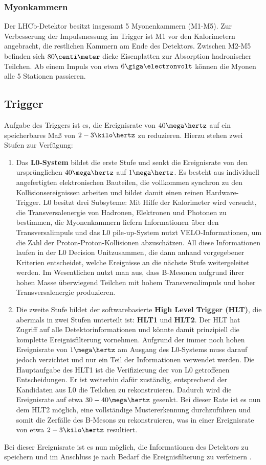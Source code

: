 \subsubsection{Myonkammern}
Der LHCb-Detektor besitzt insgesamt 5 Myonenkammern (M1-M5). Zur Verbesserung der Impulsmessung im Trigger ist M1 vor den Kalorimetern angebracht, die restlichen Kammern am Ende des Detektors. Zwischen M2-M5 befinden sich $80\centi\meter$ dicke Eisenplatten zur Absorption hadronischer Teilchen. Ab einem Impuls von etwa $6\giga\electronvolt$ können die Myonen alle 5 Stationen passieren. \cite{thesis_linn}

\subsection{Trigger}
Aufgabe des Triggers ist es, die Ereignisrate von $40\mega\hertz$ auf ein speicherbares Maß von $2-3\kilo\hertz$ zu reduzieren. Hierzu stehen zwei Stufen zur Verfügung:
\begin{enumerate}
    \item Das \textbf{L0-System} bildet die erste Stufe und senkt die Ereignisrate von den ursprünglichen $40\mega\hertz$ auf $1\mega\hertz$. Es besteht aus individuell angefertigten elektronischen Bauteilen, die vollkommen synchron zu den Kollisionsereignissen arbeiten und bildet damit einen reinen Hardware-Trigger. L0 besitzt drei Subsyteme: Mit Hilfe der Kalorimeter wird versucht, die Transversalenergie von Hadronen, Elektronen und Photonen zu bestimmen, die Myonenkammern liefern Informationen über den Transversalimpuls und das \glqq L0 pile-up\grqq-System nutzt VELO-Informationen, um die Zahl der Proton-Proton-Kollisionen abzuschätzen. All diese Informationen laufen in der \glqq L0 Decision Unit\grqq zusammen, die dann anhand vorgegebener Kriterien entscheidet, welche Ereignisse an die nächste Stufe weitergeleitet werden. Im Wesentlichen nutzt man aus, dass B-Mesonen aufgrund ihrer hohen Masse überwiegend Teilchen mit hohem Transversalimpuls und hoher Transversalenergie produzieren.
    \item Die zweite Stufe bildet der softwarebasierte \textbf{High Level Trigger (HLT)}, die abermals in zwei Stufen unterteilt ist: \textbf{HLT1} und \textbf{HLT2}. Der HLT hat Zugriff auf alle Detektorinformationen und könnte damit prinzipiell die komplette Ereignisfilterung vornehmen. Aufgrund der immer noch hohen Ereignisrate von $1\mega\hertz$ am Ausgang des L0-Systems muss darauf jedoch verzichtet und nur ein Teil der Informationen verwendet werden. Die Hauptaufgabe des HLT1 ist die Verifizierung der von L0 getroffenen Entscheidungen. Er ist weiterhin dafür zuständig, entsprechend der Kandidaten aus L0 die Teilchen zu rekonstruieren. Dadurch wird die Ereignisrate auf etwa $30-40\mega\hertz$ gesenkt. Bei dieser Rate ist es nun dem HLT2 möglich, eine vollständige Mustererkennung durchzuführen und somit die Zerfälle des B-Mesons zu rekonstruieren, was in einer Ereignisrate von etwa $2-3\kilo\hertz$ resultiert. 
\end{enumerate}
Bei dieser Ereignisrate ist es nun möglich, die Informationen des Detektors zu speichern und im Anschluss je nach Bedarf die Ereignisfilterung zu verfeinern \cite{detector}.